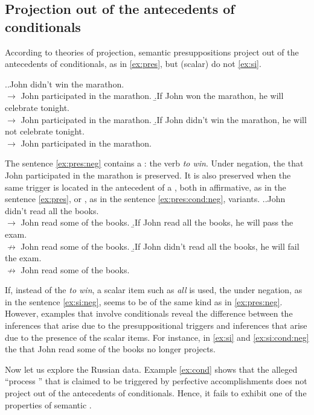 \subsection{Projection out of the antecedents of conditionals}
According to theories of  projection, semantic presuppositions project out of the antecedents of conditionals, as in \ref{ex:pres}, but (scalar)  do not \ref{ex:si}.

\ex.\a.\label{ex:pres:neg}John didn't win the marathon.\\
$\rightarrow$ John participated in the marathon.
\b.\label{ex:pres}If John won the marathon, he will celebrate tonight.\\
$\rightarrow$ John participated in the marathon.
\b.\label{ex:pres:cond:neg}If John didn't win the marathon, he will not celebrate tonight.\\
$\rightarrow$ John participated in the marathon.

The sentence \ref{ex:pres:neg} contains a : the verb \textit{to win}. Under negation, the  that John participated in the marathon is preserved. It is also preserved when the same trigger is located in the antecedent of a , both in affirmative, as in the sentence \ref{ex:pres}, or , as in the sentence \ref{ex:pres:cond:neg}, variants.
\ex.\a.\label{ex:si:neg}John didn't read all the books.\\
$\rightarrow$ John read some of the books.
\b.\label{ex:si}If John read all the books, he will pass the exam.\\
$\nrightarrow$ John read some of the books.
\b.\label{ex:si:cond:neg}If John didn't read all the books, he will fail the exam.\\
$\nrightarrow$ John read some of the books.

If, instead of the  \textit{to win}, a scalar item such as \textit{all} is used, the  under negation, as in the sentence \ref{ex:si:neg}, seems to be of the same kind as in \ref{ex:pres:neg}. However, examples that involve conditionals reveal the difference between the inferences that arise due to the presuppositional triggers and inferences that arise due to the presence of the scalar items. For instance, in \ref{ex:si} and \ref{ex:si:cond:neg} the  that John read some of the books no longer projects.

Now let us explore the Russian data. Example \ref{ex:cond} shows that the alleged ``process '' that is claimed to be triggered by perfective accomplishments does not project out of the antecedents of conditionals. Hence, it fails to exhibit one of the properties of semantic .

